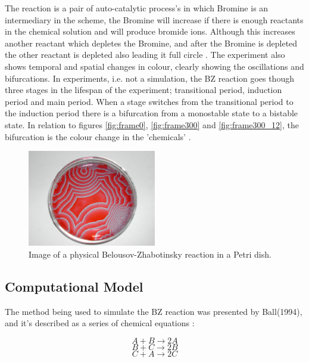 \documentclass[12pt, A4]{article}
\begin{document}
The reaction is a pair of auto-catalytic process's in which Bromine is an intermediary in the 
scheme, the Bromine will increase if there is enough reactants in the chemical solution and 
will produce bromide ions. Although this increases another reactant which depletes the Bromine, 
and after the Bromine is depleted the other reactant is depleted also leading it full circle \cite{lister1995classic}.
The experiment also shows temporal and spatial changes in colour, clearly showing 
the oscillations and bifurcations. In experiments, i.e. not a simulation, the BZ reaction 
goes though three stages in the lifespan of the experiment; transitional period, 
induction period and main period. When a stage switches from the transitional period to 
the induction period there is a bifurcation from a monostable state to a bistable state. 
In relation to figures \ref{fig:frame0}, \ref{fig:frame300} and \ref{fig:frame300_12}, the bifurcation 
is the colour change in the 'chemicals' \cite{chen2000mathematical}.


\begin{figure}[H]
  \begin{center}
    \includegraphics[width=0.5\textwidth]{bz.jpg}
  \end{center}
  \caption{Image of a physical Belousov-Zhabotinsky reaction in a Petri dish.}
  \label{fig:}
\end{figure}



\subsection{Computational Model} %
\label{sub:Computational Model}


The method being used to simulate the BZ reaction was presented by Ball(1994)\cite{ball1996designing}, 
and it's described as a series of chemical equations \cite{turner2009simple}:

\begin{equation}\label{eq1}
  A+B \rightarrow 2A
\end{equation}
\begin{equation}\label{eq2}
  B+C \rightarrow 2B
\end{equation}
\begin{equation}\label{eq3}
  C+A \rightarrow 2C
\end{equation}
\end{document}
